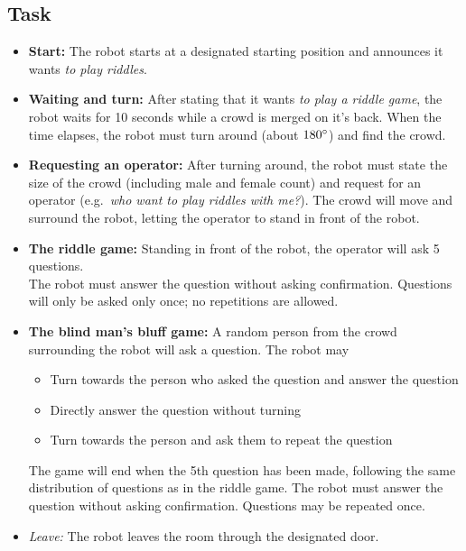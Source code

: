 \subsection{Task}
\begin{itemize}
    \item \textbf{Start:} The robot starts at a designated starting position and announces it wants \textit{to play riddles}.

    \item \textbf{Waiting and turn:} After stating that it wants \textit{to play a riddle game}, the robot waits for 10 seconds while a crowd is merged on it's back. When the time elapses, the robot must turn around (about $180\degree$) and find the crowd.

    \item \textbf{Requesting an operator:} After turning around, the robot must state the size of the crowd (including male and female count\footnotemark) and request for an operator (e.g.~\textit{who want to play riddles with me?}). The crowd will move and surround the robot, letting the operator to stand in front of the robot.

    \item \textbf{The riddle game:} Standing in front of the robot, the operator will ask 5 questions.\\
    The robot must answer the question without asking confirmation. Questions will only be asked only once; no repetitions are allowed. 

    \item \textbf{The blind man's bluff game:} A random person from the crowd surrounding the robot will ask a question. The robot may
    \begin{itemize}
        \item Turn towards the person who asked the question and answer the question
        \item Directly answer the question without turning
        \item Turn towards the person and ask them to repeat the question
    \end{itemize}
    The game will end when the 5th question has been made, following the same distribution of questions as in the riddle game. The robot must answer the question without asking confirmation. Questions may be repeated once.

    \item \textit{Leave:} The robot leaves the room through the designated door.
\end{itemize}

